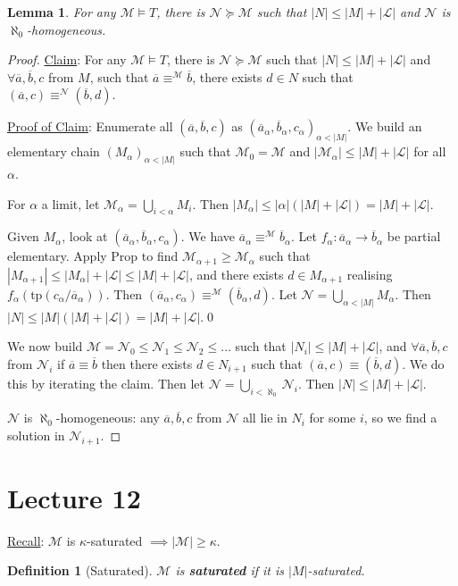 \documentclass[]{article}
\theoremstyle{custhm}
\theoremstyle{cusdef}
\newtheorem{defin}[theorem]{Definition}
\theoremstyle{custhm}
\newtheorem{lemma}[theorem]{Lemma}
\theoremstyle{custhm}
\theoremstyle{custhm}
\theoremstyle{ex}
\theoremstyle{custhm}
\theoremstyle{cusdef}
\theoremstyle{remark}
\theoremstyle{remark}
\theoremstyle{numremark}
\newcommand{\ra}{\rightarrow}
\newcommand{\undf}[1]{\textit{\textbf{#1}}}
\renewcommand{\L}{\mathcal{L}}
\newcommand{\M}{\mathcal{M}}
\renewcommand{\bar}{\overline}
\newcommand{\tp}{\textrm{tp}}
\newcommand{\N}{\mathcal{N}}
\begin{document}
\begin{lemma}
For any $\M\models T$, there is $\N\succeq\M$ such that $|N|\le |M| + |\L|$ and $\N$ is $\aleph_0$-homogeneous.
\end{lemma}
\begin{proof}
\underline{Claim}: For any $\M\models T$, there is $\N\succeq \M$ such that $|N|\le |M|+|\L|$ and $\forall \bar{a},\bar{b},c$ from $M$, such that $\bar{a}\equiv^\M\bar{b}$, there exists $d\in N$ such that $(\bar{a},c) \equiv^\N(\bar{b},d)$.

\underline{Proof of Claim}: Enumerate all $(\bar{a},\bar{b},c)$ as $(\bar{a}_\alpha,\bar{b}_\alpha,c_\alpha)_{\alpha < |M|}$. We build an elementary chain $(M_\alpha)_{\alpha < |M|}$ such that $\M_0 = \M$ and $|\M_\alpha| \le |M| + |\L|$ for all $\alpha$.

For $\alpha$ a limit, let $\M_\alpha = \bigcup_{i<\alpha}M_i$. Then $|M_\alpha| \le |\alpha|(|M|+|\L|) = |M| + |\L|$.

Given $M_\alpha$, look at $(\bar{a}_\alpha,\bar{b}_\alpha,c_\alpha)$. We have $\bar{a}_\alpha \equiv^\M\bar{b}_\alpha$. Let $f_\alpha : \bar{a}_\alpha \ra \bar{b}_\alpha$ be partial elementary. Apply Prop to find $\M_{\alpha+1} \ge \M_\alpha$ such that $|M_{\alpha+1}|\le |M_\alpha| + |\L| \le |M| + |\L|$, and there exists $d \in M_{\alpha+1}$ realising $f_\alpha(\tp(c_\alpha/\bar{a}_\alpha))$. Then $(\bar{a}_\alpha,c_\alpha) \equiv^\M(\bar{b}_\alpha,d)$. Let $\N = \bigcup_{\alpha < |M|}M_\alpha$. Then $|N| \le |M|(|M|+|\L|) = |M| + |\L|$.\qed

We now build $\M = \N_0 \le \N_1\le \N_2\le \dots$ such that $|N_i| \le |M|+|\L|$, and $\forall \bar{a},\bar{b},c$ from $\N_i$ if $\bar{a}\equiv \bar{b}$ then there exists $d\in N_{i+1}$ such that $(\bar{a},c) \equiv (\bar{b},d)$. We do this by iterating the claim. Then let $\N = \bigcup_{i<\aleph_0}\N_i$. Then $|N|\le |M| + |\L|$.

$\N$ is $\aleph_0$-homogeneous: any $\bar{a},\bar{b},c$ from $\N$ all lie in $N_i$ for some $i$, so we find a solution in $\N_{i+1}$.
\end{proof}

\section{Lecture 12}
\underline{Recall}: $\M$ is $\kappa$-saturated $\implies |\M| \ge \kappa$.

\begin{defin}[Saturated]
$\M$ is \undf{saturated} if it is $|M|$-saturated.
\end{defin}
\end{document}
